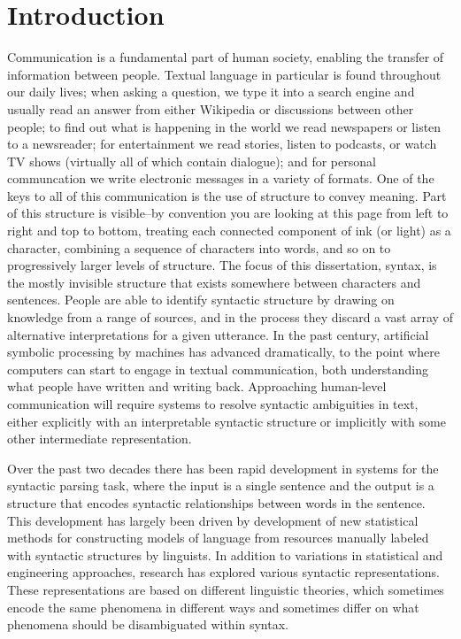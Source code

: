 \chapter{Introduction}

Communication is a fundamental part of human society, enabling the transfer of information between people.
Textual language in particular is found throughout our daily lives;
when asking a question, we type it into a search engine and usually read an answer from either Wikipedia or discussions between other people;
to find out what is happening in the world we read newspapers or listen to a newsreader;
for entertainment we read stories, listen to podcasts, or watch TV shows (virtually all of which contain dialogue);
and for personal communcation we write electronic messages in a variety of formats.
One of the keys to all of this communication is the use of structure to convey meaning.
Part of this structure is visible--by convention you are looking at this page from left to right and top to bottom, treating each connected component of ink (or light) as a character, combining a sequence of characters into words, and so on to progressively larger levels of structure.
The focus of this dissertation, syntax, is the mostly invisible structure that exists somewhere between characters and sentences.
People are able to identify syntactic structure by drawing on knowledge from a range of sources, and in the process they discard a vast array of alternative interpretations for a given utterance.
In the past century, artificial symbolic processing by machines has advanced dramatically, to the point where computers can start to engage in textual communication, both understanding what people have written and writing back.
Approaching human-level communication will require systems to resolve syntactic ambiguities in text, either explicitly with an interpretable syntactic structure or implicitly with some other intermediate representation.

Over the past two decades there has been rapid development in systems for the syntactic parsing task, where the input is a single sentence and the output is a structure that encodes syntactic relationships between words in the sentence.
This development has largely been driven by development of new statistical methods for constructing models of language from resources manually labeled with syntactic structures by linguists.
In addition to variations in statistical and engineering approaches, research has explored various syntactic representations.
These representations are based on different linguistic theories, which sometimes encode the same phenomena in different ways and sometimes differ on what phenomena should be disambiguated within syntax.

